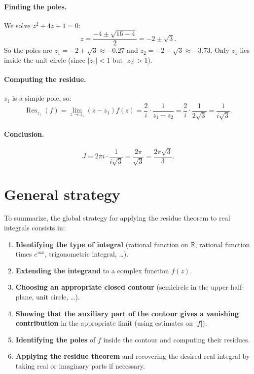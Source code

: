\paragraph{Finding the poles.}
We solve $z^2+4z+1=0$:
\[
z=\frac{-4\pm\sqrt{16-4}}{2}=-2\pm\sqrt{3}.
\]
So the poles are $z_1=-2+\sqrt{3}\approx -0.27$ and $z_2=-2-\sqrt{3}\approx -3.73$. Only $z_1$ lies inside the unit circle (since $|z_1|<1$ but $|z_2|>1$).

\paragraph{Computing the residue.}
$z_1$ is a simple pole, so:
\[
\operatorname{Res}_{z_1}(f)
=\lim_{z\to z_1}(z-z_1)f(z)
=\frac{2}{i}\cdot \frac{1}{z_1-z_2}
=\frac{2}{i}\cdot \frac{1}{2\sqrt{3}}
=\frac{1}{i\sqrt{3}}.
\]

\paragraph{Conclusion.}
\[
J=2\pi i\cdot \frac{1}{i\sqrt{3}}=\frac{2\pi}{\sqrt{3}}=\frac{2\pi\sqrt{3}}{3}.
\]

\section{General strategy}

To summarize, the global strategy for applying the residue theorem to real integrals consists in:
\begin{enumerate}
\item \textbf{Identifying the type of integral} (rational function on $\mathbb{R}$, rational function times $e^{iax}$, trigonometric integral, \dots).
\item \textbf{Extending the integrand} to a complex function $f(z)$.
\item \textbf{Choosing an appropriate closed contour} (semicircle in the upper half-plane, unit circle, \dots).
\item \textbf{Showing that the auxiliary part of the contour gives a vanishing contribution} in the appropriate limit (using estimates on $|f|$).
\item \textbf{Identifying the poles} of $f$ inside the contour and computing their residues.
\item \textbf{Applying the residue theorem} and recovering the desired real integral by taking real or imaginary parts if necessary.
\end{enumerate}

